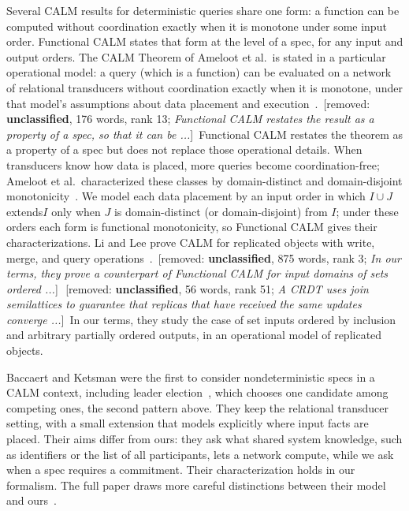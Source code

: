 \documentclass[sigconf]{cidr-2027}
\theoremstyle{remark}
\newcommand{\commitment}{commitment\xspace}
\newcommand{\inrel}{extends\xspace}          %
\newcommand{\removednote}[1]{{\color{cutred}\footnotesize\,[removed: #1]\,}}
\begin{document}
Several CALM results for deterministic queries share one form: a function can
be computed without coordination exactly when it is monotone under some input
order. Functional CALM states that form at the level of a spec, for any input
and output orders. \textcolor{newblue}{The CALM Theorem of Ameloot et al.\ is stated in a
particular operational model: a query (which is a function) can be evaluated on a network of
relational transducers without coordination exactly when it is monotone, under
that model's assumptions about data placement and
execution~\cite{ameloot2013relational,ameloot2015weaker}.} \removednote{\textbf{unclassified}, 176 words, rank 13; \textit{Functional CALM restates the result as a property of a spec, so that it can be ...}} \textcolor{newblue}{Functional CALM restates the
theorem as a property of a spec but does not replace those operational
details.} \textcolor{newblue}{When transducers know how data is placed, more queries become
coordination-free; Ameloot et al.\ characterized these classes by
domain-distinct and domain-disjoint
monotonicity~\cite{ameloot2015weaker,zinn2012winmove}.} \textcolor{newblue}{We model each data
placement by an input order in which $I\cup J$ \inrel $I$ only when $J$ is
domain-distinct (or domain-disjoint) from $I$; under these orders each form is
functional monotonicity, so Functional CALM gives their characterizations.} Li
and Lee prove CALM for replicated objects with write, merge, and query
operations~\cite{li2025coordinationfree}. \removednote{\textbf{unclassified}, 875 words, rank 3; \textit{In our terms, they prove a counterpart of Functional CALM for input domains of sets ordered ...}} \removednote{\textbf{unclassified}, 56 words, rank 51; \textit{A CRDT uses join semilattices to guarantee that replicas that have received the same updates converge ...}} \textcolor{newblue}{In our terms, they study the case of set inputs ordered by
inclusion and arbitrary partially ordered outputs, in an operational model of
replicated objects.}

\textcolor{newblue}{Baccaert and Ketsman were the first to consider nondeterministic specs in a
CALM context, including leader election~\cite{baccaert2023dcbq,baccaert2026spectrum}, which
chooses one candidate among competing ones, the second pattern above.} \textcolor{newblue}{They keep the relational transducer setting, with a small extension that models
explicitly where input facts are placed.} \textcolor{newblue}{Their aims differ from ours: they ask
what shared system knowledge, such as identifiers or the list of all
participants, lets a network compute, while we ask when a spec requires a
\commitment.} \textcolor{newblue}{Their characterization holds in our
formalism.} \textcolor{newblue}{The full paper draws more careful distinctions between their model
and ours~\cite{hellerstein2026completecalmfull}.}
\end{document}
